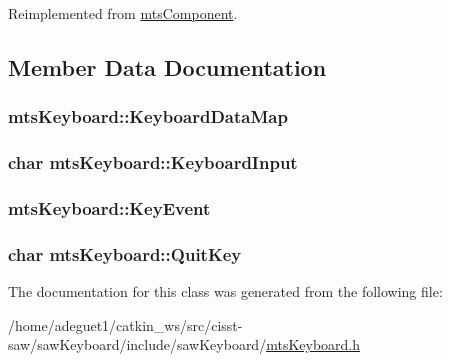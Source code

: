Reimplemented from \hyperlink{classmts_component_aaf28f0262b44eb6866e10089a02fa6e4}{mts\-Component}.



\subsection{Member Data Documentation}
\hypertarget{classmts_keyboard_acb0628dad536242f1253245106a1e71f}{
\subsubsection[{Keyboard\-Data\-Map}]{ mts\-Keyboard\-::\-Keyboard\-Data\-Map\hspace{0.3cm}{\ttfamily [protected]}}}\label{classmts_keyboard_acb0628dad536242f1253245106a1e71f}
\hypertarget{classmts_keyboard_a23ecc71912ee8cf5f722a93a1a29613e}{
\subsubsection[{Keyboard\-Input}]{\setlength{\rightskip}{0pt plus 5cm}char mts\-Keyboard\-::\-Keyboard\-Input\hspace{0.3cm}{\ttfamily [protected]}}}\label{classmts_keyboard_a23ecc71912ee8cf5f722a93a1a29613e}
\hypertarget{classmts_keyboard_afdd1b226b01e8d9da4c14b83c7c61b82}{
\subsubsection[{Key\-Event}]{ mts\-Keyboard\-::\-Key\-Event\hspace{0.3cm}{\ttfamily [protected]}}}\label{classmts_keyboard_afdd1b226b01e8d9da4c14b83c7c61b82}
\hypertarget{classmts_keyboard_a46f3784b9176a49b7782d927a0cea892}{
\subsubsection[{Quit\-Key}]{\setlength{\rightskip}{0pt plus 5cm}char mts\-Keyboard\-::\-Quit\-Key\hspace{0.3cm}{\ttfamily [protected]}}}\label{classmts_keyboard_a46f3784b9176a49b7782d927a0cea892}


The documentation for this class was generated from the following file\-:\begin{DoxyCompactItemize}
\item 
/home/adeguet1/catkin\-\_\-ws/src/cisst-\/saw/saw\-Keyboard/include/saw\-Keyboard/\hyperlink{mts_keyboard_8h}{mts\-Keyboard.\-h}\end{DoxyCompactItemize}
